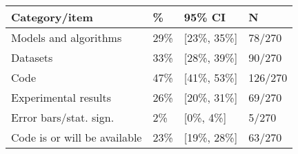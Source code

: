 \begin{tabular}{llll}
\hline
Category/item & \% & 95\% CI  & N \\
\hline
Models and algorithms & 29\% & [23\%, 35\%] & 78/270\\
Datasets & 33\% & [28\%, 39\%] & 90/270\\
Code & 47\% & [41\%, 53\%] & 126/270\\
Experimental results & 26\% & [20\%, 31\%] & 69/270\\
Error bars/stat. sign.& 2\% & [0\%, 4\%] & 5/270\\
Code is or will be available & 23\% & [19\%, 28\%] & 63/270\\
\hline
\end{tabular}
